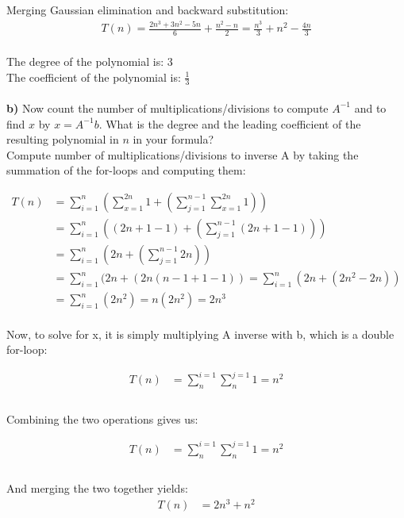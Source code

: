 \documentclass{article}
\begin{document}
Merging Gaussian elimination and backward substitution: \\
\begin{align*}
T(n) = \frac{2n^3 + 3n^2 - 5n}{6} + \frac{n^2 - n}{2} = \frac{n^3}{3} + n^2 - \frac{4n}{3}
\end{align*} \\

The degree of the polynomial is: 3\\
The coefficient of the polynomial is: $\frac{1}{3}$ \\\\

{\bf b)} Now count the number of multiplications/divisions to compute $A^{-1}$ and
to find $x$ by $x=A^{-1}b$. What is the degree and the leading
coefficient of the resulting polynomial in $n$ in your formula? \\

Compute number of multiplications/divisions to inverse A by taking the summation of the for-loops and computing them:

\begin{align*}
T(n) &= \sum_{i=1}^{n} ( \sum_{x=1}^{2n} 1 +  (\sum_{j=1}^{n-1} \sum_{x=1}^{2n} 1) ) \\
     &= \sum_{i=1}^{n} ( (2n+1-1) + (\sum_{j=1}^{n-1} (2n+1-1)) ) \\
     &= \sum_{i=1}^{n} ( 2n + (\sum_{j=1}^{n-1} 2n) ) \\
     &= \sum_{i=1}^{n} ( 2n + (2n(n-1+1-1)) = \sum_{i=1}^{n} ( 2n + (2n^2 - 2n)) \\
     &= \sum_{i=1}^{n} (2n^2) = n(2n^2) = 2n^3
\end{align*} \\

Now, to solve for x, it is simply multiplying A inverse with b, which is a double for-loop:

\begin{align*}
T(n) &= \sum_{n}^{i=1} \sum_{n}^{j=1} 1 = n^2\\
\end{align*} \\

Combining the two operations gives us:

\begin{align*}
T(n) &= \sum_{n}^{i=1} \sum_{n}^{j=1} 1 = n^2\\
\end{align*} \\

And merging the two together yields:
\begin{align*}
T(n) &= 2n^3 + n^2\\
\end{align*}
\end{document}
